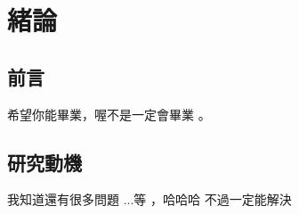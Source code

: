 
\chapter{緒論}\label{1}


\section{前言}\label{1-1}
希望你能畢業\cite{ec}，喔不是一定會畢業 \cite{hsieh}。

\newpage

\section{研究動機}\label{1-2}
我知道還有很多問題 \cite{m1}...等 \cite{chu} ，哈哈哈 \cite{liu} 不過一定能解決

\newpage




		



